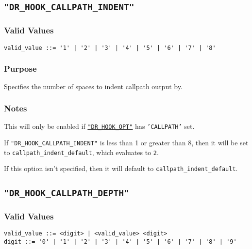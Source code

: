 
\subsection{\texttt{"DR\_HOOK\_CALLPATH\_INDENT"}}
\label{section:flags:DR_HOOK_CALLPATH_INDENT}
\vspace{-2ex}
\subsubsection{Valid Values}
\vspace{-2ex}
\verb+valid_value ::= '1' | '2' | '3' | '4' | '5' | '6' | '7' | '8' +\\

\vspace{-2ex}
\subsubsection{Purpose}
\vspace{-2ex}
Specifies the number of spaces to indent callpath output by.

\vspace{-2ex}
\subsubsection{Notes}
\vspace{-2ex}
This will only be enabled if \hyperref[section:flags:DR_HOOK_OPT]{\texttt{"DR\_HOOK\_OPT"}} has \texttt{'CALLPATH'} set.

If \texttt{"DR\_HOOK\_CALLPATH\_INDENT"} is less than 1 or greater than 8, then it will be set to \verb|callpath_indent_default|, which evaluates to \verb|2|.

If this option isn't specified, then it will default to \verb|callpath_indent_default|.



\subsection{\texttt{"DR\_HOOK\_CALLPATH\_DEPTH"}}
\label{section:flags:DR_HOOK_CALLPATH_DEPTH}
\vspace{-2ex}
\subsubsection{Valid Values}
\vspace{-2ex}
\verb+valid_value ::= <digit> | <valid_value> <digit> + \\
\verb+digit ::= '0' | '1' | '2' | '3' | '4' | '5' | '6' | '7' | '8' | '9'+

